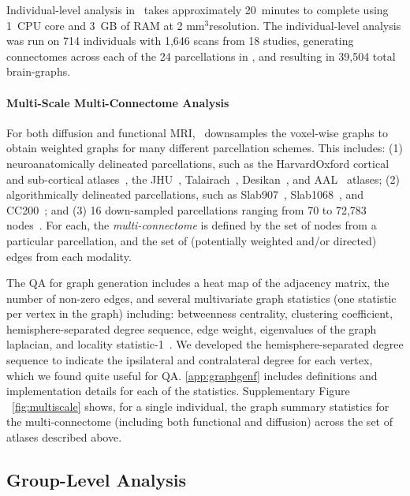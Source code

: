 \documentclass[11pt]{article}
\begin{document}
\begin{multicols}{2}
Individual-level analysis in \ndmgf~takes approximately 20~minutes to complete using 1~CPU core and 3~GB of RAM at 2 mm$^3$resolution.
The individual-level analysis was run on 714 individuals with 1,646 scans from 18 studies, generating connectomes across each of the 24 parcellations in \ndmgd, and resulting in 39,504 total brain-graphs.

\paragraph{Multi-Scale Multi-Connectome Analysis}

For both diffusion and functional MRI, \ndmg~downsamples the voxel-wise graphs to obtain weighted graphs for many different parcellation schemes. This includes: (1) neuroanatomically delineated parcellations, such as the HarvardOxford cortical and sub-cortical atlases~\cite{harvardoxford}, the JHU~\cite{jhu}, Talairach~\cite{talairach}, Desikan~\cite{desikan}, and AAL~\cite{aal} atlases; (2) algorithmically delineated parcellations, such as Slab907~\cite{slab907}, Slab1068~\cite{slab1068}, and CC200~\cite{cpac};  and (3) 16 down-sampled parcellations ranging from 70 to 72,783 nodes~\cite{glocal}.  
For each, the \emph{multi-connectome} is defined by the set of nodes from a particular parcellation, and the set of (potentially weighted and/or directed) edges from each modality.

The QA for graph generation includes a heat map of the adjacency matrix, the number of non-zero edges, and several multivariate graph statistics (one statistic per vertex in the graph) including:  betweenness centrality, clustering coefficient, hemisphere-separated degree sequence, edge weight, eigenvalues of the graph laplacian, and locality statistic-1~\cite{glocal}.
We developed the hemisphere-separated degree sequence to indicate the ipsilateral and contralateral degree for each vertex, which we found quite useful for QA.  
\ref{app:graphgenf} includes definitions and implementation details for each of the statistics.
Supplementary Figure ~\ref{fig:multiscale} shows, for a single individual, the graph summary statistics for the multi-connectome (including both functional and diffusion) across the set of atlases described above.



\subsection{Group-Level Analysis}


\end{multicols}
\end{document}
